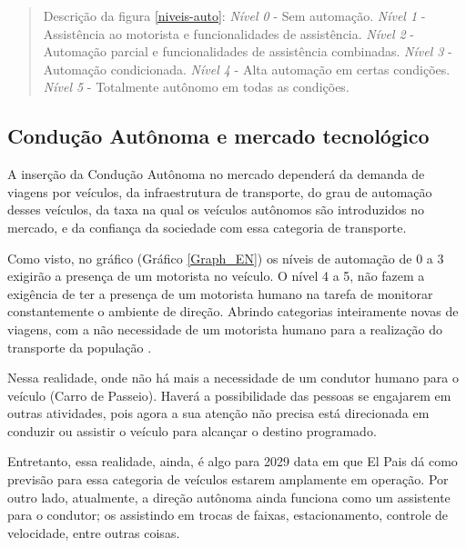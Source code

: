 \begin{quote}
Descrição da figura \ref{niveis-auto}:  \textit{Nível 0} - Sem automação.  \textit{Nível 1} - Assistência ao motorista e funcionalidades de assistência.  \textit{Nível 2} - Automação parcial e funcionalidades de assistência combinadas.  \textit{Nível 3} - Automação condicionada.  \textit{Nível 4} - Alta automação em certas condições.  \textit{Nível 5} - Totalmente autônomo em todas as condições. 
\end{quote}



\subsection{Condução Autônoma e mercado tecnológico}

A inserção da Condução Autônoma no mercado dependerá da demanda de viagens por veículos, da infraestrutura de transporte, do grau de automação desses veículos, da taxa na qual os veículos autônomos são introduzidos no mercado, e da confiança da sociedade com essa categoria de transporte. 

Como visto, no gráfico (Gráfico \ref{Graph_EN}) os níveis de automação de 0 a 3 exigirão a presença de um motorista no veículo. O nível 4 a 5, não fazem a exigência de ter a presença de um motorista humano na tarefa de monitorar constantemente o ambiente de direção. 
Abrindo categorias inteiramente novas de viagens, com a não necessidade de um motorista humano para a realização do transporte da população \cite{notif}.

Nessa realidade, onde não há mais a necessidade de um condutor humano para o veículo (Carro de Passeio). Haverá a possibilidade das pessoas se engajarem em outras atividades, pois agora a sua atenção não precisa está direcionada em conduzir ou assistir o veículo para alcançar o destino programado. 


Entretanto, essa realidade, ainda, é algo para 2029 \cite{elpais} data em que El Pais dá como previsão para essa categoria de veículos estarem amplamente em operação. Por outro lado, atualmente, a direção autônoma ainda funciona como um assistente para o condutor; os assistindo em trocas de faixas, estacionamento, controle de velocidade, entre outras coisas. 

